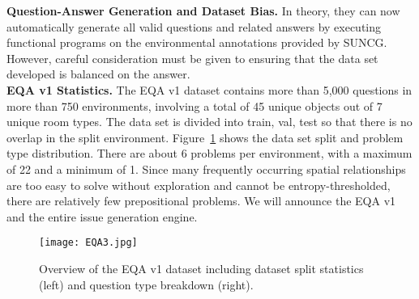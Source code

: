 \documentclass[10pt,twocolumn,letterpaper]{article}
\begin{document}
       \textbf{Question-Answer Generation and Dataset Bias.} In theory, they can now automatically generate all valid questions and related answers by executing functional programs on the environmental annotations provided by SUNCG. However, careful consideration must be given to ensuring that the data set developed is balanced on the answer. \\
       \textbf{EQA v1 Statistics.} The EQA v1 dataset contains more than 5,000 questions in more than 750 environments, involving a total of 45 unique objects out of 7 unique room types. The data set is divided into train, val, test so that there is no overlap in the split environment. Figure~\ref{fig3} shows the data set split and problem type distribution. There are about 6 problems per environment, with a maximum of 22 and a minimum of 1. Since many frequently occurring spatial relationships are too easy to solve without exploration and cannot be entropy-thresholded, there are relatively few prepositional problems. We will announce the EQA v1 and the entire issue generation engine.
        \begin{figure}[htbp]
            \centering
            \texttt{[image: EQA3.jpg]}
            \caption{Overview of the EQA v1 dataset including dataset split statistics (left) and question type breakdown (right).}
            \label{fig3}
       \end{figure}
\end{document}
